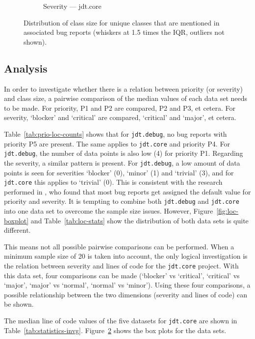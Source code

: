 \begin{figure}
\begin{subfigure}[b]{0.5\textwidth}
                \caption{Severity --- jdt.core}
                \label{fig:box-sev-core}
        \end{subfigure}
        \caption{Distribution of class size for unique classes that are mentioned in associated bug reports (whiskers at 1.5 times the IQR, outliers not shown).}
        \label{fig:box-prio-sev}
\end{figure}

\subsection{Analysis} %
In order to investigate whether there is a relation between priority (or severity) and class size, a pairwise comparison of the median values of each data set needs to be made. For priority, P1 and P2 are compared, P2 and P3, et cetera. For severity, `blocker' and `critical' are compared, `critical' and `major', et cetera.

Table~\ref{tab:prio-loc-counts} shows that for \texttt{jdt.debug}, no bug reports with priority P5 are present. The same applies to \texttt{jdt.core} and priority P4. For \texttt{jdt.debug}, the number of data points is also low (4) for priority P1. Regarding the severity, a similar pattern is present. For \texttt{jdt.debug}, a low amount of data points is seen for severities `blocker' (0), `minor' (1) and `trivial' (3), and for \texttt{jdt.core} this applies to `trivial' (0). This is consistent with the research performed in \cite{Lamkanfi2010}, who found that most bug reports get assigned the default value for priority and severity. It is tempting to combine both \texttt{jdt.debug} and \texttt{jdt.core} into one data set to overcome the sample size issues. However, Figure~\ref{fig:loc-boxplot} and Table~\ref{tab:loc-stats} show the distribution of both data sets is quite different. 

This means not all possible pairwise comparisons can be performed. When a minimum sample size of 20 is taken into account, the only logical investigation is the relation between severity and lines of code for the \texttt{jdt.core} project. With this data set, four comparisons can be made (`blocker' vs `critical', `critical' vs `major', `major' vs `normal', `normal' vs `minor'). Using these four comparisons, a possible relationship between the two dimensions (severity and lines of code) can be shown.

The median line of code values of the five datasets for \texttt{jdt.core} are shown in Table~\ref{tab:statistics-invg}. Figure~\ref{fig:box-prio-sev} shows the box plots for the data sets.

